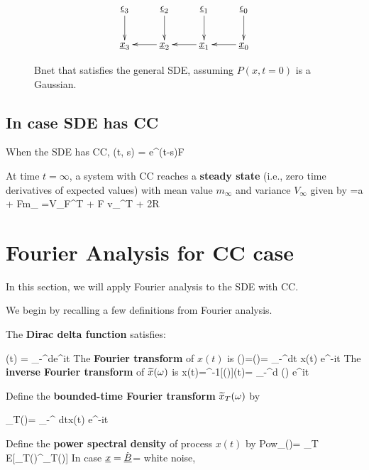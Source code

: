 \begin{figure}[h!]
$$
\xymatrix{
\ul{\eps}_3 \ar[d]
& \ul{\eps}_2 \ar[d]
& \ul{\eps}_1 \ar[d]
& \ul{\eps}_0\ar[d]
\\
\rvx_3
& \rvx _2 \ar[l]
& \rvx_1 \ar[l]
& \rvx_0\ar[l]
}
$$
\caption{Bnet that satisfies the general SDE,
assuming $P(x,t=0)$ is a Gaussian.}
\label{fig-1st-2nd-order-bnet}
\end{figure}





\subsection{In case SDE has CC}
When the SDE has CC,
\beq
\Psi(t, s) = e^{(t-s)F}
\eeq


At time $t=\infty$,
a system with CC reaches
a {\bf steady state} (i.e., zero time derivatives of expected values)
with mean value $m_\infty$
and variance $V_\infty$ given by
=a + Fm_\infty
\eeq
{}=V_\infty F^T  + F v_\infty^T + 2R
\eeq


\section{Fourier Analysis for CC case}

In this section, we will apply Fourier
analysis to the SDE with CC.

We begin by recalling a few definitions from Fourier
analysis.

\newcommand{\Tintegral}[1]{
\int_{-\;\frac{T}{#1}}^{\frac{T}{#1}}}

The {\bf Dirac delta function} satisfies:

\beq
\delta(t) = \int_{-\infty}^{\infty}d\omega \;e^{i\omega t}
\eeq
The {\bf Fourier transform} of $x(t)$ is
\beq
{}(\omega)=\calf[x(t)](\omega)=
\int_{-\infty}^{\infty}dt\; x(t) e^{-i\omega t}
\eeq
The {\bf inverse Fourier transform} of ${\widetilde{x}}(\omega)$ is
\beq
x(t)=\calf^{-1}[(\omega)](t)=
\int_{-\infty}^{\infty}d\omega\; (\omega) e^{i\omega t}
\eeq

Define the {\bf bounded-time Fourier transform} ${\widetilde{x}}_T(\omega)$ by

\beq
{}_T(\omega)=\Tintegral{2}
dt\;x(t) e^{-i\omega t}
\eeq


Define the
{\bf power spectral density}
of process $x(t)$ by
\beq
Pow_\rvx(\omega)= \lim_{T}
 E[_T(\omega)^\dagger_T(\omega)]
\eeq
In case $\rvx=\dot{\rvB}$= white noise,


